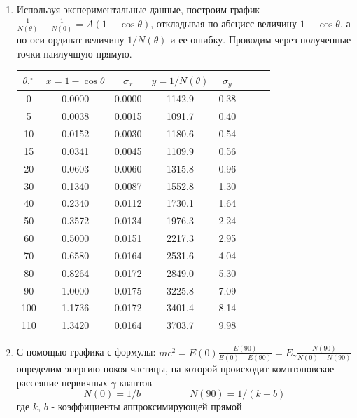 \documentclass[a4paper,12pt]{article}
\begin{document}
\begin{enumerate}
    \item Используя экспериментальные данные, построим график $\frac{1}{N(\theta)} -\frac{1}{N(0)}=A(1-\cos{\theta})$, откладывая по абсцисс величину $1-\cos{\theta}$, а по оси ординат величину $1/N(\theta)$ и ее ошибку. Проводим через полученные точки наилучшую прямую.
    \begin{table}[h!]
    \centering
    \begin{tabular}{||c|c|c|c|c|c|c|c||}
    \hline
    $\theta, ^\circ$ & $x=1-\cos{\theta}$ & $\sigma_x$ & $y = 1/N(\theta)$ & $\sigma_y$ \\ 
    \hline
    \hline
    0    & 0.0000 & 0.0000 & 1142.9 & 0.38  \\
    \hline
    5    & 0.0038 & 0.0015 & 1091.7 & 0.40  \\
    \hline
    10   & 0.0152 & 0.0030 & 1180.6 & 0.54  \\
    \hline
    15   & 0.0341 & 0.0045 & 1109.9 & 0.56  \\
    \hline
    20   & 0.0603 & 0.0060 & 1315.8 & 0.96  \\
    \hline
    30   & 0.1340 & 0.0087 & 1552.8 & 1.30  \\
    \hline
    40   & 0.2340 & 0.0112 & 1730.1 & 1.64  \\
    \hline
    50   & 0.3572 & 0.0134 & 1976.3 & 2.24  \\
    \hline
    60   & 0.5000 & 0.0151 & 2217.3 & 2.95  \\
    \hline
    70   & 0.6580 & 0.0164 & 2531.6 & 4.04  \\
    \hline
    80   & 0.8264 & 0.0172 & 2849.0 & 5.30  \\
    \hline
    90   & 1.0000 & 0.0175 & 3225.8 & 7.09  \\
    \hline
    100  & 1.1736 & 0.0172 & 3401.4 & 8.14  \\
    \hline
    110  & 1.3420 & 0.0164 & 3703.7 & 9.98  \\
    \hline
    \end{tabular}
    \end{table}

    \item С помощью графика с формулы: $mc^2=E(0)\frac{E(90)}{E(0)-E(90)}=E_\gamma\frac{N(90)}{N(0)-N(90)}$ определим энергию покоя частицы, на которой происходит комптоновское рассеяние первичных $\gamma$-квантов
    $$
    N(0) = 1/b \quad\quad\quad\quad\quad N(90)=1/(k+b)
    $$
    где $k$, $b$ - коэффициенты аппроксимирующей прямой 
    

\end{enumerate}
\end{document}

